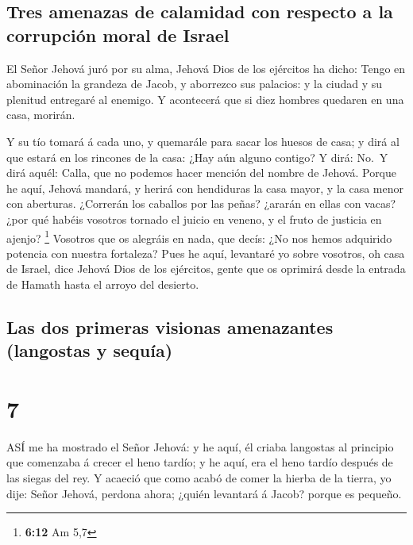 \hypertarget{tres-amenazas-de-calamidad-con-respecto-a-la-corrupciuxf3n-moral-de-israel}{%
\subsection{Tres amenazas de calamidad con respecto a la corrupción
moral de
Israel}\label{tres-amenazas-de-calamidad-con-respecto-a-la-corrupciuxf3n-moral-de-israel}}

 El Señor Jehová juró por su alma, Jehová Dios de los
ejércitos ha dicho: Tengo en abominación la grandeza de Jacob, y
aborrezco sus palacios: y la ciudad y su plenitud entregaré al enemigo.
 Y acontecerá que si diez hombres quedaren en una casa,
morirán.

 Y su tío tomará á cada uno, y quemarále para sacar los
huesos de casa; y dirá al que estará en los rincones de la casa: ¿Hay
aún alguno contigo? Y dirá: No.~Y dirá aquél: Calla, que no podemos
hacer mención del nombre de Jehová.  Porque he aquí, Jehová
mandará, y herirá con hendiduras la casa mayor, y la casa menor con
aberturas.  ¿Correrán los caballos por las peñas? ¿ararán
en ellas con vacas? ¿por qué habéis vosotros tornado el juicio en
veneno, y el fruto de justicia en ajenjo? \footnote{\textbf{6:12} Am 5,7}
 Vosotros que os alegráis en nada, que decís: ¿No nos hemos
adquirido potencia con nuestra fortaleza?  Pues he aquí,
levantaré yo sobre vosotros, oh casa de Israel, dice Jehová Dios de los
ejércitos, gente que os oprimirá desde la entrada de Hamath hasta el
arroyo del desierto.

\hypertarget{las-dos-primeras-visionas-amenazantes-langostas-y-sequuxeda}{%
\subsection{Las dos primeras visionas amenazantes (langostas y
sequía)}\label{las-dos-primeras-visionas-amenazantes-langostas-y-sequuxeda}}

\hypertarget{section-6}{%
\section{7}\label{section-6}}

 ASÍ me ha mostrado el Señor Jehová: y he aquí, él criaba
langostas al principio que comenzaba á crecer el heno tardío; y he aquí,
era el heno tardío después de las siegas del rey.  Y acaeció
que como acabó de comer la hierba de la tierra, yo dije: Señor Jehová,
perdona ahora; ¿quién levantará á Jacob? porque es pequeño.


